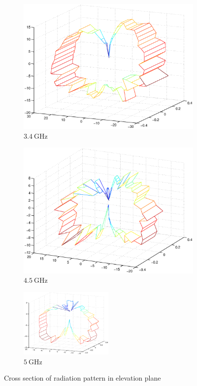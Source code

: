 \documentclass[a4paper]{article}        %
\begin{document}
		\begin{figure}[H]
			\begin{subfigure}{0.5\textwidth}
			\centering
				\includegraphics[width=\textwidth]{images/antenna/3D_radpat_3_4G.eps}
				\caption{$\SI{3.4}{\giga\hertz}$}
			\end{subfigure}
			\begin{subfigure}{0.5\textwidth}
			\centering
				\includegraphics[width=\textwidth]{images/antenna/3D_radpat_4_5G.eps}
				\caption{$\SI{4.5}{\giga\hertz}$}
			\end{subfigure}
			\begin{subfigure}{\textwidth}
			\centering
				\includegraphics[width=0.5\textwidth]{images/antenna/3D_radpat_5G.eps}
				\caption{$\SI{5}{\giga\hertz}$}
			\end{subfigure}
		\caption{Cross section of radiation pattern in elevation plane}
		\label{fig:ant_radpat_elev}
		\end{figure}
\end{document}
